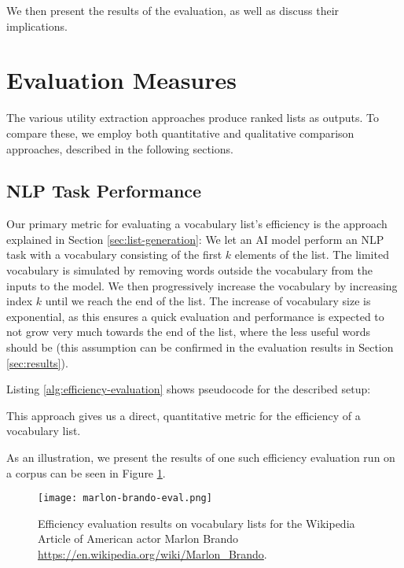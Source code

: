 We then present the results of the evaluation, as well as discuss their implications.

\section{Evaluation Measures}

The various utility extraction approaches produce ranked lists as outputs.
To compare these, we employ both quantitative and qualitative comparison approaches, described in the following sections.

\subsection{NLP Task Performance}
Our primary metric for evaluating a vocabulary list's efficiency is the approach explained in Section \ref{sec:list-generation}:
We let an AI model perform an NLP task with a vocabulary consisting of the first $k$ elements of the list.
The limited vocabulary is simulated by removing words outside the vocabulary from the inputs to the model.
We then progressively increase the vocabulary by increasing index $k$ until we reach the end of the list.
The increase of vocabulary size is exponential, as this ensures a quick evaluation and performance is expected to not grow very much towards the end of the list, where the less useful words should be (this assumption can be confirmed in the evaluation results in Section \ref{sec:results}).

Listing \ref{alg:efficiency-evaluation} shows pseudocode for the described setup:




This approach gives us a direct, quantitative metric for the efficiency of a vocabulary list.

As an illustration, we present the results of one such efficiency evaluation run on a corpus can be seen in Figure \ref{fig:marlon-brando-eval}.
\begin{figure}[H]
	\centering
	\texttt{[image: marlon-brando-eval.png]}
	\caption{Efficiency evaluation results on vocabulary lists for the Wikipedia Article of American actor Marlon Brando \url{https://en.wikipedia.org/wiki/Marlon_Brando}.}
	\label{fig:marlon-brando-eval}
\end{figure}

